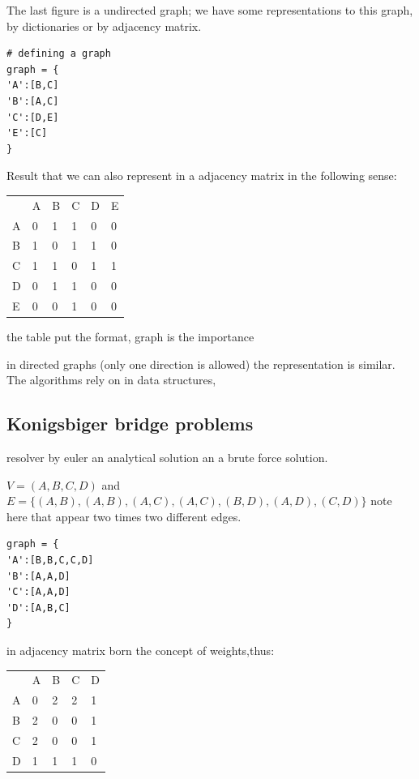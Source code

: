 \documentclass[10pt,a4paper]{article}
\begin{document}
The last figure is a undirected graph;
we have some representations to this graph, by dictionaries or by adjacency matrix.

\begin{lstlisting}
# defining a graph 
graph = {
'A':[B,C]
'B':[A,C]
'C':[D,E]
'E':[C]
}
\end{lstlisting}
Result that we can also represent in a adjacency matrix in the following sense:

\begin{table}[h]
\begin{tabular}{llllll}
 & A & B & C & D & E \\ \cline{2-6} 
\multicolumn{1}{l|}{A} & 0 & 1 & 1 & 0 & 0 \\
\multicolumn{1}{l|}{B} & 1 & 0 & 1 & 1 & 0 \\
\multicolumn{1}{l|}{C} & 1 & 1 & 0 & 1 & 1 \\
\multicolumn{1}{l|}{D} & 0 & 1 & 1 & 0 & 0 \\
\multicolumn{1}{l|}{E} & 0 & 0 & 1 & 0 & 0
\end{tabular}
\end{table}
the table put the format, graph is the importance 


\newpage
in directed graphs (only one direction is allowed) the representation is similar.
The algorithms rely on in data structures,






\subsection{Konigsbiger bridge problems}
resolver by euler an analytical solution an a brute force solution.

$V = (A,B,C,D)$
and $E = \{ (A,B), (A,B) , (A,C), (A,C) , (B,D) , (A,D), (C,D)  \}$
note here that appear two times two different edges.

\begin{lstlisting}
graph = {
'A':[B,B,C,C,D]
'B':[A,A,D]
'C':[A,A,D]
'D':[A,B,C]
}
\end{lstlisting}

in adjacency matrix born the concept of weights,thus:


\begin{table}[h]
\begin{tabular}{lllll}
 & A & B & C & D \\ \cline{2-5} 
\multicolumn{1}{l|}{A} & 0 & 2 & 2 & 1 \\
\multicolumn{1}{l|}{B} & 2 & 0 & 0 & 1 \\
\multicolumn{1}{l|}{C} & 2 & 0 & 0 & 1 \\
\multicolumn{1}{l|}{D} & 1 & 1 & 1 & 0
\end{tabular}
\end{table}
\end{document}
